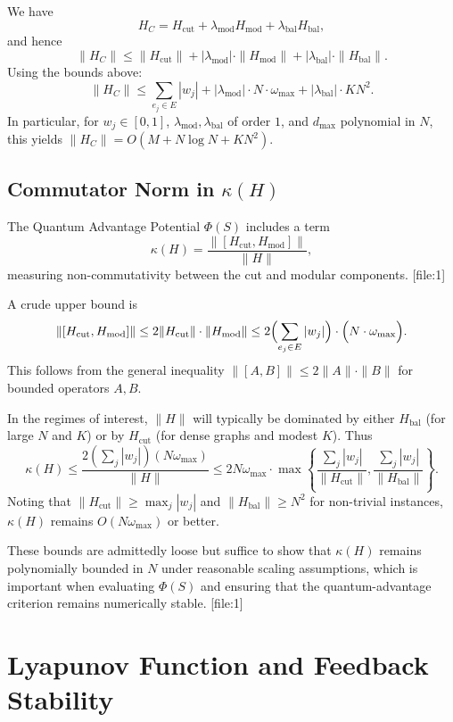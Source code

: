 \documentclass[11pt]{article}
\begin{document}
We have
\[
  H_C = H_{\text{cut}} + \lambda_{\text{mod}}H_{\text{mod}} + \lambda_{\text{bal}}H_{\text{bal}},
\]
and hence
\[
  \|H_C\|
  \le \|H_{\text{cut}}\| + |\lambda_{\text{mod}}|\cdot\|H_{\text{mod}}\| + |\lambda_{\text{bal}}|\cdot\|H_{\text{bal}}\|.
\]
Using the bounds above:
\[
  \|H_C\|
  \le \sum_{e_j\in E} |w_j|
     + |\lambda_{\text{mod}}|\cdot N\cdot \omega_{\max}
     + |\lambda_{\text{bal}}|\cdot K N^2.
\]
In particular, for $w_j\in[0,1]$, $\lambda_{\text{mod}},\lambda_{\text{bal}}$ of order $1$, and $d_{\max}$ polynomial in $N$, this yields $\|H_C\| = O(M + N\log N + K N^2)$.

\subsection{Commutator Norm in $\kappa(H)$}

The Quantum Advantage Potential $\Phi(S)$ includes a term
\[
  \kappa(H) = \frac{\|[H_{\text{cut}},H_{\text{mod}}]\|}{\|H\|},
\]
measuring non-commutativity between the cut and modular components. [file:1]

A crude upper bound is
\[
  \|[H_{\text{cut}},H_{\text{mod}}]\|
    \le 2\|H_{\text{cut}}\|\cdot\|H_{\text{mod}}\|
    \le 2\Bigl(\sum_{e_j\in E} |w_j|\Bigr)\cdot\Bigl(N\cdot\omega_{\max}\Bigr).
\]
This follows from the general inequality $\|[A,B]\|\le 2\|A\|\cdot\|B\|$ for bounded operators $A,B$.

In the regimes of interest, $\|H\|$ will typically be dominated by either $H_{\text{bal}}$ (for large $N$ and $K$) or by $H_{\text{cut}}$ (for dense graphs and modest $K$). Thus
\[
  \kappa(H)
  \le \frac{2(\sum_j |w_j|)(N\omega_{\max})}{\|H\|}
  \le 2N\omega_{\max}\cdot \max\left\{
    \frac{\sum_j |w_j|}{\|H_{\text{cut}}\|},
    \frac{\sum_j |w_j|}{\|H_{\text{bal}}\|}
  \right\}.
\]
Noting that $\|H_{\text{cut}}\|\ge \max_j |w_j|$ and $\|H_{\text{bal}}\|\ge N^2$ for non-trivial instances, $\kappa(H)$ remains $O(N\omega_{\max})$ or better.

These bounds are admittedly loose but suffice to show that $\kappa(H)$ remains polynomially bounded in $N$ under reasonable scaling assumptions, which is important when evaluating $\Phi(S)$ and ensuring that the quantum-advantage criterion remains numerically stable. [file:1]

\section{Lyapunov Function and Feedback Stability}
\label{app:lyapunov}
\end{document}
